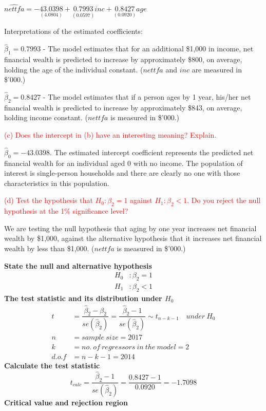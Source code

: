 \documentclass[12pt]{report}
\begin{document}
\vspace{-\baselineskip}
\centering $\widehat{nettfa} = -\underset{(4.0804)}{43.0398} + \underset{(0.0597)}{0.7993}inc + \underset{(0.0920)}{0.8427}age$

\justify \noindent Interpretations of the estimated coefficients:

\noindent $\hat{\beta}_1 = 0.7993$ - The model estimates that for an additional \$1,000 in income, net financial wealth is predicted to increase by approximately \$800, on average, holding the age of the individual constant. ($nettfa$ and $inc$ are measured in \$'000.)

\noindent $\hat{\beta}_2 = 0.8427$ - The model estimates that if a person ages by 1 year, his/her net financial wealth is predicted to increase by approximately \$843, on average, holding income constant. ($nettfa$ is measured in \$'000.)

\noindent \textcolor{red}{(c) Does the intercept in (b) have an interesting meaning? Explain.}

\noindent $\hat{\beta}_0 = -43.0398$. The estimated intercept coefficient represents the predicted net financial wealth for an individual aged 0 with no income. The population of interest is single-person households and there are clearly no one with those characteristics in this population.

\newpage
\noindent \textcolor{red}{(d) Test the hypothesis that $H_0: \beta_2 = 1$ against $H_1: \beta_2 < 1$. Do you reject the null hypothesis at the 1\% significance level?}

\noindent We are testing the null hypothesis that aging by one year increases net financial wealth by \$1,000, against the alternative hypothesis that it increases net financial wealth by less than \$1,000. ($nettfa$ is measured in \$'000.)

\noindent \textbf{State the null and alternative hypothesis}
\begin{align*}
H_0&: \beta_2 = 1 \\
H_1&: \beta_2 < 1
\end{align*}
\noindent \textbf{The test statistic and its distribution under $H_0$}
\begin{align*}
t &= \dfrac{\hat{\beta}_2 - \beta_2}{se(\hat{\beta}_2)} = \dfrac{\hat{\beta}_2 - 1}{se(\hat{\beta}_2)} \sim t_{n-k-1} \quad under\ H_0 \\
n &= sample\ size = 2017 \\
k &= no.\ of\ regressors\ in\ the\ model = 2 \\
d.o.f &= n-k-1=2014
\end{align*}
\noindent \textbf{Calculate the test statistic}
$$t_{calc} = \dfrac{\hat{\beta}_2 - 1}{se(\hat{\beta}_2)} = \dfrac{0.8427 - 1}{0.0920} = -1.7098$$
\noindent \textbf{Critical value and rejection region}
\end{document}
